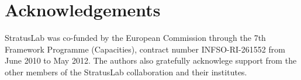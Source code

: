 \section*{Acknowledgements}

StratusLab was co-funded by the European Commission through the 7th
Framework Programme (Capacities), contract number INFSO-RI-261552 from
June 2010 to May 2012\@.  The authors also gratefully acknowlege
support from the other members of the StratusLab collaboration and
their institutes.

